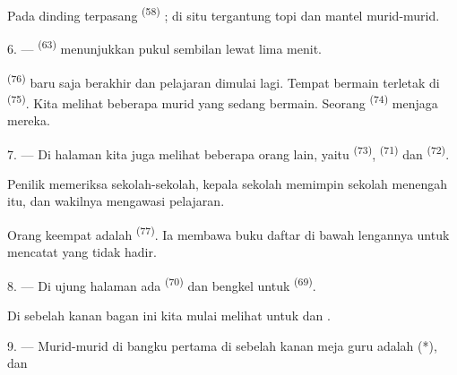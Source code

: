 Pada dinding terpasang  \textsuperscript{(58)} ;
di situ tergantung topi dan mantel murid-murid.

\VUsaut{5.2mm}
\VUsaut{3.6mm}

6. ---  \textsuperscript{(63)} menunjukkan pukul
sembilan lewat lima menit.

 \textsuperscript{(76)} baru saja berakhir dan
pelajaran dimulai lagi. Tempat bermain terletak di 
\textsuperscript{(75)}. Kita melihat beberapa murid yang sedang
bermain. Seorang  \textsuperscript{(74)} menjaga
mereka.

7. --- Di halaman kita juga melihat beberapa orang lain, yaitu
 \textsuperscript{(73)},  \textsuperscript{(71)} dan 
\textsuperscript{(72)}.

Penilik memeriksa sekolah-sekolah, kepala sekolah memimpin sekolah
menengah itu, dan wakilnya mengawasi pelajaran.

Orang keempat adalah  \textsuperscript{(77)}. Ia
membawa buku daftar di bawah lengannya untuk mencatat yang tidak
hadir.

8. --- Di ujung halaman ada 
\textsuperscript{(70)} dan bengkel untuk 
\textsuperscript{(69)}.

Di sebelah kanan bagan ini kita mulai melihat  untuk  dan .


\VUsaut{2.4mm}

\VUsaut{3.0mm}

9. --- Murid-murid di bangku pertama di sebelah kanan meja guru
adalah  (*),  dan 

